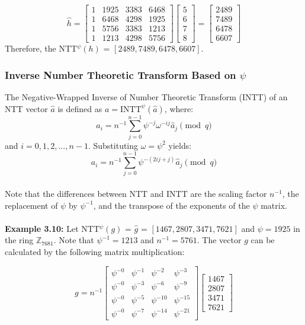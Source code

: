 \documentclass[12pt]{report}
\begin{document}
\[\hat{h}=\begin{bmatrix}1&1925&3383&6468\\ 1&6468&4298&1925\\ 1&5756&3383&1213\\ 1&1213&4298&5756\end{bmatrix}\begin{bmatrix}5\\ 6\\ 7\\ 8\end{bmatrix}=\begin{bmatrix}2489\\ 7489\\ 6478\\ 6607\end{bmatrix}\]
Therefore, the NTT$^{\psi}(h)$ = $[2489,7489,6478,6607]$.

\subsubsection{Inverse Number Theoretic Transform Based on $\psi$}

The Negative-Wrapped Inverse of Number Theoretic Transform (INTT) of an NTT vector $\hat{a}$ is defined as $a = \text{INTT}^{\psi}(\hat{a})$, where:
\[a_{i}=n^{-1}\sum_{j=0}^{n-1}\psi^{-j}\omega^{-ij}\hat{a}_{j} \pmod{q}\]
and $i=0,1,2,...,n-1.$ Substituting $\omega=\psi^{2}$ yields:
\[a_{i}=n^{-1}\sum_{j=0}^{n-1}\psi^{-(2ij+j)}\hat{a}_{j} \pmod{q}\] \\
Note that the differences between NTT and INTT are the scaling factor $n^{-1}$, the replacement of $\psi$ by $\psi^{-1}$, and the transpose of the exponents of the $\psi$ matrix.\\ \\
\textbf{Example 3.10:} Let NTT$^{\psi}(g)$ = $\hat{g}$ = $[1467,2807,3471,7621]$ and $\psi=1925$ in the ring $\mathbb{Z}_{7681}$. Note that $\psi^{-1}=1213$ and $n^{-1}=5761.$ The vector $g$ can be calculated by the following matrix multiplication:

\[g=n^{-1}\begin{bmatrix}\psi^{-0}&\psi^{-1}&\psi^{-2}&\psi^{-3}\\ \psi^{-0}&\psi^{-3}&\psi^{-6}&\psi^{-9}\\ \psi^{-0}&\psi^{-5}&\psi^{-10}&\psi^{-15}\\ \psi^{-0}&\psi^{-7}&\psi^{-14}&\psi^{-21}\end{bmatrix}\begin{bmatrix}1467\\ 2807\\ 3471\\ 7621\end{bmatrix}\]
\end{document}
